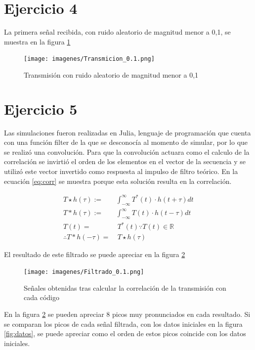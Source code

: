 \documentclass[12pt,letterpaper]{article}     %
\begin{document}
\newpage
\section{Ejercicio 4}

La primera señal recibida, con ruido aleatorio de magnitud menor a 0,1, se muestra en
la figura \ref{fig:transimcion01}

\begin{figure}[!ht]
\centering
\texttt{[image: imagenes/Transmicion\_0.1.png]}
\caption{Transmisión con ruido aleatorio de magnitud menor a 0,1}
\label{fig:transimcion01}
\end{figure}

\section{Ejercicio 5}

Las simulaciones fueron realizadas en Julia, lenguaje de programación que cuenta con 
una función filter de la que se desconocía al momento de simular, por lo que se realizó una convolución.
Para que la convolución actuara como el calculo de la correlación se invirtió el orden
de los elementos en el vector de la secuencia y se utilizó este vector invertido como
respuesta al impulso de filtro teórico. En la ecuación \ref{eq:corr} se muestra porque esta 
solución resulta en la correlación.

\begin{equation}
	\label{eq:corr}
	\begin{split}
		T\star h(\tau) :=& \int_{-\infty}^{\infty} T^*(t)\cdot h(t+\tau)dt\\
		T\ast h(\tau) :=& \int_{-\infty}^{\infty} T(t)\cdot h(t-\tau)dt\\
		T(t) =&\ T^*(t) \because T(t)\in \mathbb{R}\\
		\therefore 		T\ast h(-\tau) =&\ T\star h(\tau)
	\end{split}
\end{equation}

El resultado de este filtrado se puede apreciar en la figura \ref{fig:filtro0,1}

\begin{figure}[!ht]
\centering
\texttt{[image: imagenes/Filtrado\_0.1.png]}
\caption{Señales obtenidas tras calcular la correlación de la transmisión con cada código}
\label{fig:filtro0,1}
\end{figure}

En la figura \ref{fig:filtro0,1} se pueden apreciar 8 picos muy pronunciados en cada resultado.
Si se comparan los picos de cada señal filtrada, con los datos iniciales en la figura \ref{fig:datos},
se puede apreciar como el orden de estos picos coincide con los datos iniciales.
\end{document}

